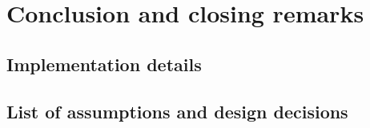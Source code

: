 \section{Conclusion and closing remarks}


\subsection{Implementation details}

\subsection{List of assumptions and design decisions}
